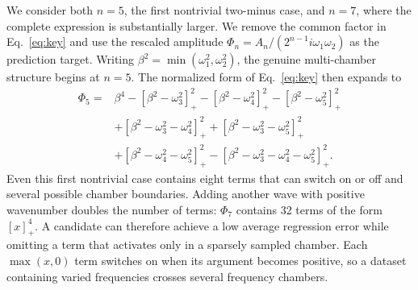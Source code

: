 \documentclass{article}
\begin{document}
We consider both $n=5$, the first nontrivial two-minus case, and $n=7$, where
the complete expression is substantially larger. We remove the common factor
in Eq.~\eqref{eq:key} and use the rescaled amplitude
$\Phi_n=A_n/(2^{n-1}i\omega_1\omega_2)$ as the prediction target.
Writing $\beta^2=\min(\omega_1^2,\omega_2^2)$, the genuine multi-chamber
structure begins at $n=5$. The normalized form of Eq.~\eqref{eq:key} then expands to
\begin{align}
\Phi_5={}&\beta^4
-[\beta^2-\omega_3^2]_+^2
-[\beta^2-\omega_4^2]_+^2
-[\beta^2-\omega_5^2]_+^2\nonumber\\
&+[\beta^2-\omega_3^2-\omega_4^2]_+^2
+[\beta^2-\omega_3^2-\omega_5^2]_+^2\nonumber\\
&+[\beta^2-\omega_4^2-\omega_5^2]_+^2
-[\beta^2-\omega_3^2-\omega_4^2-\omega_5^2]_+^2.
\label{eq:sr-n5-expanded}
\end{align}
Even this first nontrivial case contains eight terms that can switch on or off and
several possible chamber boundaries. Adding another wave with positive wavenumber doubles
the number of terms: $\Phi_7$ contains 32 terms of the form
$[x]_+^4$. A candidate can therefore achieve a low average regression error
while omitting a term that activates only in a sparsely sampled chamber.
Each $\max(x,0)$ term switches on when its argument becomes positive, so a
dataset containing varied frequencies crosses several frequency chambers.
\end{document}
